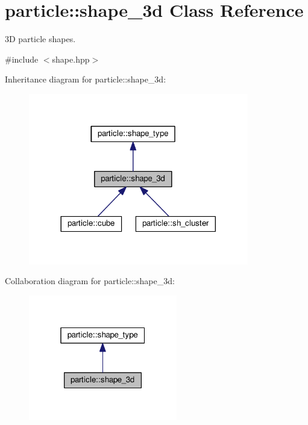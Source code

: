 \hypertarget{classparticle_1_1shape__3d}{}\section{particle\+:\+:shape\+\_\+3d Class Reference}
\label{classparticle_1_1shape__3d}


3D particle shapes.  




{\ttfamily \#include $<$shape.\+hpp$>$}



Inheritance diagram for particle\+:\+:shape\+\_\+3d\+:
\nopagebreak
\begin{figure}[H]
\begin{center}
\leavevmode
\includegraphics[width=272pt]{d0/d2e/classparticle_1_1shape__3d__inherit__graph}
\end{center}
\end{figure}


Collaboration diagram for particle\+:\+:shape\+\_\+3d\+:
\nopagebreak
\begin{figure}[H]
\begin{center}
\leavevmode
\includegraphics[width=184pt]{d5/d01/classparticle_1_1shape__3d__coll__graph}
\end{center}
\end{figure}
